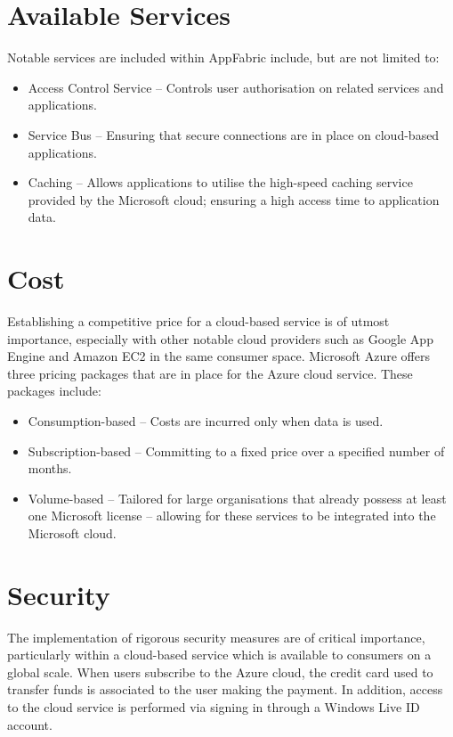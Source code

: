 \section{Available Services}
Notable services are included within AppFabric include, but are not limited to\ftAtwo:\ftAtwoText
\begin{itemize}
\item Access Control Service -- Controls user authorisation on related services and applications.
\item Service Bus -- Ensuring that secure connections are in place on cloud-based applications.
\item Caching -- Allows applications to utilise the high-speed caching service provided by the Microsoft cloud; ensuring a high access time to application data.
\end{itemize}

\section{Cost}
Establishing a competitive price for a cloud-based service is of utmost importance, especially with other notable cloud providers such as Google App Engine and Amazon EC2 in the same consumer space. Microsoft Azure offers three pricing packages\ftAthree{} that are in place for the Azure cloud service. These packages include:\ftAthreeText
\begin{itemize}
\item Consumption-based -- Costs are incurred only when data is used.
\item Subscription-based -- Committing to a fixed price over a specified number of months.
\item Volume-based -- Tailored for large organisations that already possess at least one Microsoft license -- allowing for these services to be integrated into the Microsoft cloud. 
\end{itemize}

\section{Security}

The implementation of rigorous security measures are of critical importance, particularly within a cloud-based service which is available to consumers on a global scale. When users subscribe to the Azure cloud, the credit card used to transfer funds is associated to the user making the payment. In addition, access to the cloud service is performed via signing in through a Windows Live ID account. 

